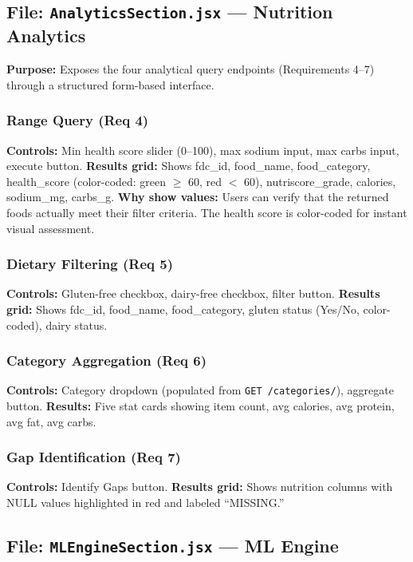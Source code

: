 \documentclass[12pt,a4paper]{article}
\begin{document}
\subsection{File: \texttt{AnalyticsSection.jsx} — Nutrition Analytics}

\textbf{Purpose:} Exposes the four analytical query endpoints (Requirements 4–7) through a structured form-based interface.

\subsubsection{Range Query (Req 4)}
\textbf{Controls:} Min health score slider (0–100), max sodium input, max carbs input, execute button.
\textbf{Results grid:} Shows fdc\_id, food\_name, food\_category, health\_score (color-coded: green $\ge$ 60, red $<$ 60), nutriscore\_grade, calories, sodium\_mg, carbs\_g.
\textbf{Why show values:} Users can verify that the returned foods actually meet their filter criteria. The health score is color-coded for instant visual assessment.

\subsubsection{Dietary Filtering (Req 5)}
\textbf{Controls:} Gluten-free checkbox, dairy-free checkbox, filter button.
\textbf{Results grid:} Shows fdc\_id, food\_name, food\_category, gluten status (Yes/No, color-coded), dairy status.

\subsubsection{Category Aggregation (Req 6)}
\textbf{Controls:} Category dropdown (populated from \texttt{GET /categories/}), aggregate button.
\textbf{Results:} Five stat cards showing item count, avg calories, avg protein, avg fat, avg carbs.

\subsubsection{Gap Identification (Req 7)}
\textbf{Controls:} Identify Gaps button.
\textbf{Results grid:} Shows nutrition columns with NULL values highlighted in red and labeled ``MISSING.''

\subsection{File: \texttt{MLEngineSection.jsx} — ML Engine}
\end{document}

